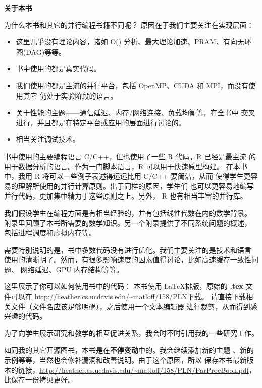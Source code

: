 ﻿\newpage

\begin{center}
{\bf \large 关于本书}
\end{center}

为什么本书和其它的并行编程书籍不同呢？
原因在于我们主要关注在实现层面：

\begin{itemize}

\item 这里几乎没有理论内容，诸如 O() 分析、最大理论加速、PRAM、有向无环图(DAG)等等。

\item 书中使用的都是真实代码。

\item 我们使用的都是主流的并行平台，包括 OpenMP、CUDA 和 MPI，而没有使用其它
仍处于实验阶段的语言。

\item 关于性能的主题——通信延迟、内存/网络连接、负载均衡等，在全书中
交叉进行，并且都是在特定平台或应用的层面进行讨论的。

\item 相当关注调试技术。

\end{itemize}

书中使用的主要编程语言 C/C++，但也使用了一些 R 代码。R 已经是最主流
的用于数据分析的语言。作为一门脚本语言，R 可以用于快速原型构建。
在本书中，我用 R 将可以一些例子表述得远远比用 C/C++ 要简洁，从而
使得学生更容易的理解所使用的并行计算原则。出于同样的原因，学生们
也可以更容易地编写并行代码，更加集中精力于这些原则之上。另外，
R 也有相当丰富的并行库。

我们假设学生在编程方面是有相当经验的，并有包括线性代数在内的数学背景。
附录里回顾了本书所需要的数学知识。另一个附录提供了不同系统问题的概述，
包括进程调度和虚拟内存等。

需要特别说明的是，书中多数代码没有进行优化。我们主要关注的是技术和语言
使用的清晰明了。然而，有很多影响速度的因素值得讨论，比如高速缓存一致性问题、
网络延迟、GPU 内存结构等等。

这里展示了你可以如何使用书中的代码：
本书使用 \LaTeX 排版，原始的 {\bf .tex} 文件可以在
\url{http://heather.cs.ucdavis.edu/~matloff/158/PLN}下载。
请直接下载相关文件（文件名应该足够明确），之后使用一个文本编辑器
进行裁剪，从而得到感兴趣的代码。

为了向学生展示研究和教学的相互促进关系，我会时不时引用我的一些研究工作。

如同我的其它开源图书，本书是在\textbf{不停变动}中的。我会继续添加新的主题
、新的示例等等，当然也会修补漏洞和改善说明。由于这个原因，所以
保存本书最新版本的链接，\url{http://heather.cs.ucdavis.edu/~matloff/158/PLN/ParProcBook.pdf}，
比保存一份拷贝更好。

